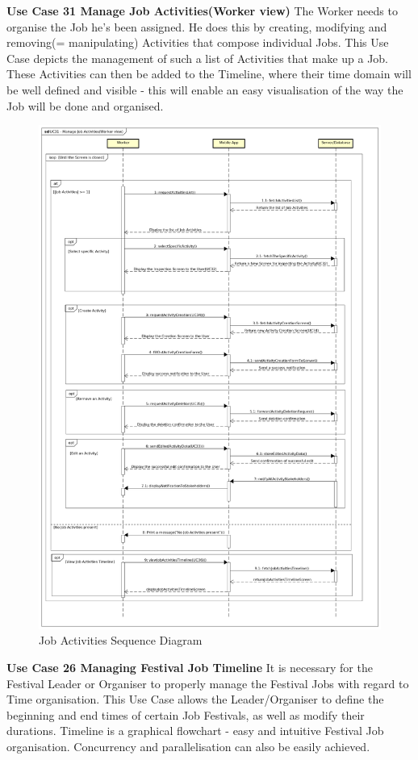 				\textbf{Use Case 31 Manage Job Activities(Worker view)}
				The Worker needs to organise the Job he's been assigned. He does this by creating, modifying and removing(= manipulating) Activities that compose individual Jobs.
				This Use Case depicts the management of such a list of Activities that make up a Job. These Activities can then be added to the Timeline, where their time domain will be well defined and visible - this will enable an easy visualisation of the way the Job will be done and organised.
				\begin{figure}[H]
					\includegraphics[width=\linewidth]{diagrams/sd-diag0-jobact.png}
					\caption{Job Activities Sequence Diagram}
					\label{fig:sd0_job_activities}
				\end{figure}
				
				\textbf{Use Case 26 Managing Festival Job Timeline}
				It is necessary for the Festival Leader or Organiser to properly manage the Festival Jobs with regard to Time organisation.
				This Use Case allows the Leader/Organiser to define the beginning and end times of certain Job Festivals, as well as modify their durations.
				Timeline is a graphical flowchart - easy and intuitive Festival Job organisation. Concurrency and parallelisation can also be easily achieved.
				
